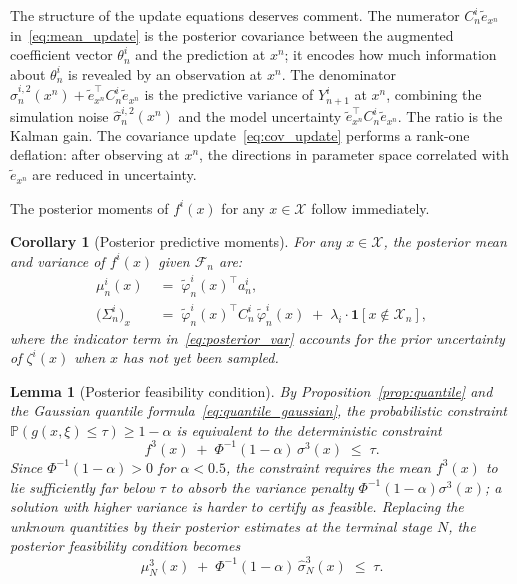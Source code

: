 \documentclass[12pt]{article}
\theoremstyle{plain}
\newtheorem{lemma}{Lemma}[section]
\newtheorem{corollary}{Corollary}[section]
\theoremstyle{definition}
\theoremstyle{remark}
\begin{document}
The structure of the update equations deserves comment.  The numerator $C^i_n \tilde{e}_{x^n}$ in~\eqref{eq:mean_update} is the posterior covariance between the augmented coefficient vector $\theta^i_n$ and the prediction at $x^n$; it encodes how much information about $\theta^i_n$ is revealed by an observation at $x^n$.  The denominator $\hat{\sigma}^{i,2}_n(x^n) + \tilde{e}_{x^n}^\top C^i_n \tilde{e}_{x^n}$ is the predictive variance of $Y^i_{n+1}$ at $x^n$, combining the simulation noise $\hat{\sigma}^{i,2}_n(x^n)$ and the model uncertainty $\tilde{e}_{x^n}^\top C^i_n \tilde{e}_{x^n}$.  The ratio is the Kalman gain.  The covariance update~\eqref{eq:cov_update} performs a rank-one deflation: after observing at $x^n$, the directions in parameter space correlated with $\tilde{e}_{x^n}$ are reduced in uncertainty.

The posterior moments of $f^i(x)$ for any $x \in \mathcal{X}$ follow immediately.

\begin{corollary}[Posterior predictive moments]\label{cor:predictive}
For any $x \in \mathcal{X}$, the posterior mean and variance of $f^i(x)$ given $\mathcal{F}_n$ are:
\begin{align}
  \mu^i_n(x) &\;=\; \tilde{\varphi}^i_n(x)^\top a^i_n, \label{eq:posterior_mean} \\
  \bigl(\Sigma^i_n\bigr)_x &\;=\; \tilde{\varphi}^i_n(x)^\top C^i_n\, \tilde{\varphi}^i_n(x) \;+\; \lambda_i \cdot \mathbf{1}[x \notin \mathcal{X}_n], \label{eq:posterior_var}
\end{align}
where the indicator term in~\eqref{eq:posterior_var} accounts for the prior uncertainty of $\zeta^i(x)$ when $x$ has not yet been sampled.
\end{corollary}

\begin{lemma}[Posterior feasibility condition]\label{lem:quantile}
By Proposition~\ref{prop:quantile} and the Gaussian quantile formula~\eqref{eq:quantile_gaussian}, the probabilistic constraint $\mathbb{P}(g(x,\xi)\le\tau)\ge 1-\alpha$ is equivalent to the deterministic constraint
\begin{equation}\label{eq:quantile_constraint}
  f^3(x) \;+\; \Phi^{-1}(1-\alpha)\, \sigma^3(x) \;\leq\; \tau.
\end{equation}
Since $\Phi^{-1}(1-\alpha) > 0$ for $\alpha < 0.5$, the constraint requires the mean $f^3(x)$ to lie sufficiently far below $\tau$ to absorb the variance penalty $\Phi^{-1}(1-\alpha)\sigma^3(x)$; a solution with higher variance is harder to certify as feasible.  Replacing the unknown quantities by their posterior estimates at the terminal stage $N$, the \emph{posterior feasibility condition} becomes
\begin{equation}\label{eq:posterior_feasibility}
  \mu^3_N(x) \;+\; \Phi^{-1}(1-\alpha)\, \hat{\sigma}^3_N(x) \;\leq\; \tau.
\end{equation}
\end{lemma}
\end{document}

